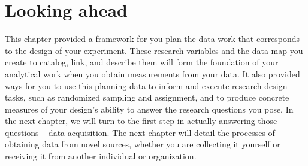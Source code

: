 \section{Looking ahead}
This chapter provided a framework for you
plan the data work that corresponds to the design of your experiment.
These research variables and the data map you create
to catalog, link, and describe them
will form the foundation of your analytical work
when you obtain measurements from your data.
It also provided ways for you to use this planning data
to inform and execute research design tasks,
such as randomized sampling and assignment,
and to produce concrete measures
of your design's ability to answer the research questions you pose.
In the next chapter,
we will turn to the first step in actually answering those questions --
data acquisition.
The next chapter will detail the processes of obtaining
data from novel sources,
whether you are collecting it yourself or
receiving it from another individual or organization.
